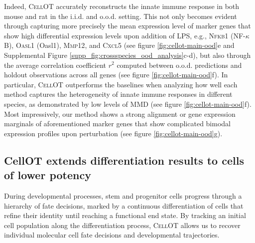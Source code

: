 Indeed, \textsc{CellOT} accurately reconstructs the innate immune response in both mouse and rat in the i.i.d. and o.o.d. setting.
This not only becomes evident through capturing more precisely the mean expression level of marker genes that show high differential expression levels upon addition of LPS, e.g., \textsc{Nfkb1} (NF-$\kappa$B), \textsc{Oasl1} (Oasl1), \textsc{Mmp12}, and \textsc{Cxcl5} (see figure \ref{fig:cellot-main-ood}e and Supplemental Figure \ref{supp_fig:crossspecies_ood_analysis}c-d), but also through the average correlation coefficient $r^2$ computed between o.o.d. predictions and holdout observations across all genes (see figure \ref{fig:cellot-main-ood}f).
In particular, \textsc{CellOT} outperforms the baselines when analyzing how well each method captures the heterogeneity of innate immune responses in different species, as demonstrated by low levels of MMD (see figure \ref{fig:cellot-main-ood}f).
Most impressively, our method shows a strong alignment or gene expression marginals of aforementioned marker genes that show complicated bimodal expression profiles upon perturbation (see figure \ref{fig:cellot-main-ood}g).

\subsection{CellOT extends differentiation results to cells of lower potency}

During developmental processes, stem and progenitor cells progress through a hierarchy of fate decisions, marked by a continuous differentiation of cells that refine their identity until reaching a functional end state.
By tracking an initial cell population along the differentiation process, \textsc{CellOT} allows us to recover individual molecular cell fate decisions and developmental trajectories. 

